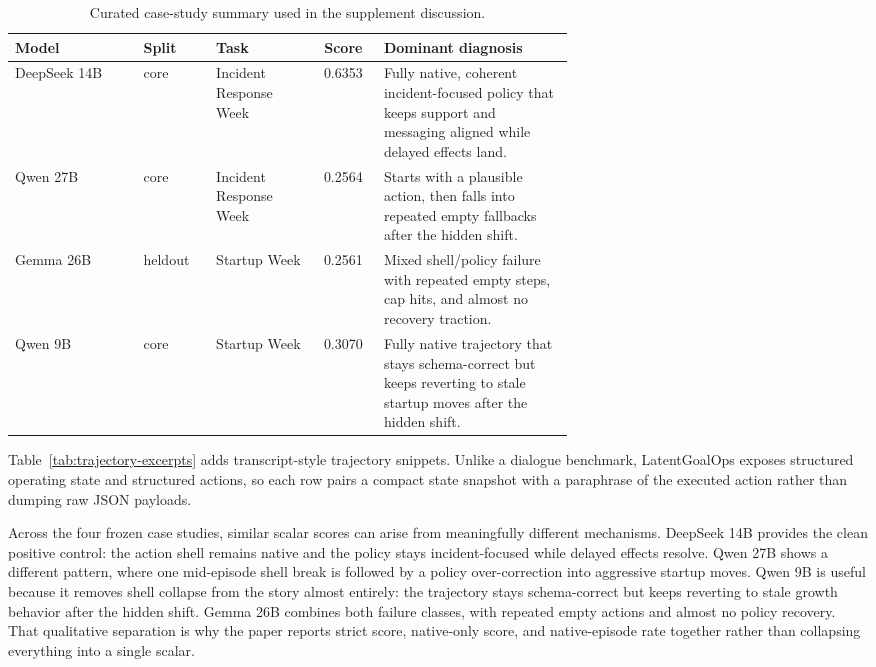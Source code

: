 \begin{table}[H]
  \centering
  \scriptsize
  \setlength{\tabcolsep}{5pt}
  \begin{tabular}{lp{0.13\linewidth}p{0.18\linewidth}cp{0.34\linewidth}}
    \toprule
    Model & Split & Task & Score & Dominant diagnosis \\
    \midrule
    DeepSeek 14B & core & Incident Response Week & 0.6353 & Fully native, coherent incident-focused policy that keeps support and messaging aligned while delayed effects land. \\
    Qwen 27B & core & Incident Response Week & 0.2564 & Starts with a plausible action, then falls into repeated empty fallbacks after the hidden shift. \\
    Gemma 26B & heldout & Startup Week & 0.2561 & Mixed shell/policy failure with repeated empty steps, cap hits, and almost no recovery traction. \\
    Qwen 9B & core & Startup Week & 0.3070 & Fully native trajectory that stays schema-correct but keeps reverting to stale startup moves after the hidden shift. \\
    \bottomrule
  \end{tabular}
  \caption{Curated case-study summary used in the supplement discussion.}
  \label{tab:casestudies}
\end{table}

Table~\ref{tab:trajectory-excerpts} adds transcript-style trajectory snippets.
Unlike a dialogue benchmark, LatentGoalOps exposes structured operating state
and structured actions, so each row pairs a compact state snapshot with a
paraphrase of the executed action rather than dumping raw JSON payloads.

Across the four frozen case studies, similar scalar scores can arise from
meaningfully different mechanisms. DeepSeek 14B provides the clean positive
control: the action shell remains native and the policy stays incident-focused
while delayed effects resolve. Qwen 27B shows a different pattern, where one
mid-episode shell break is followed by a policy over-correction into aggressive
startup moves. Qwen 9B is useful because it removes shell collapse from the
story almost entirely: the trajectory stays schema-correct but keeps reverting
to stale growth behavior after the hidden shift. Gemma 26B combines both
failure classes, with repeated empty actions and almost no policy recovery.
That qualitative separation is why the paper reports strict score, native-only
score, and native-episode rate together rather than collapsing everything into
a single scalar.

